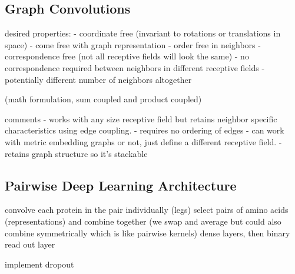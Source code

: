 \subsection{Graph Convolutions}
desired properties:
- coordinate free (invariant to rotations or translations in space) - come free with graph representation
- order free in neighbors
- correspondence free (not all receptive fields will look the same)
	- no correspondence required between neighbors in different receptive fields
	- potentially different number of neighbors altogether
	
(math formulation, sum coupled and product coupled)

comments
- works with any size receptive field but retains neighbor specific characteristics using edge coupling.
- requires no ordering of edges
- can work with metric embedding graphs or not, just define a different receptive field. 
- retains graph structure so it's stackable

\subsection{Pairwise Deep Learning Architecture}
convolve each protein in the pair individually (legs)
select pairs of amino acids (representations) and combine together (we swap and average but could also combine symmetrically which is like pairwise kernels)
dense layers, then binary read out layer

implement dropout